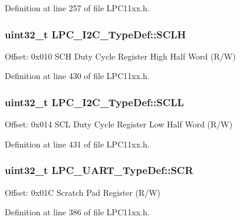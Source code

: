 Definition at line 257 of file L\+P\+C11xx.\+h.

\subsubsection[{\texorpdfstring{S\+C\+LH}{SCLH}}]{ uint32\+\_\+t L\+P\+C\+\_\+\+I2\+C\+\_\+\+Type\+Def\+::\+S\+C\+LH}\hypertarget{group___l_p_c11xx___definitions_ga5e408689670ce2cca437972896bc241d}{}\label{group___l_p_c11xx___definitions_ga5e408689670ce2cca437972896bc241d}
Offset\+: 0x010 S\+CH Duty Cycle Register High Half Word (R/W) 

Definition at line 430 of file L\+P\+C11xx.\+h.

\subsubsection[{\texorpdfstring{S\+C\+LL}{SCLL}}]{ uint32\+\_\+t L\+P\+C\+\_\+\+I2\+C\+\_\+\+Type\+Def\+::\+S\+C\+LL}\hypertarget{group___l_p_c11xx___definitions_gaf1ecc95ca301033c54b4f860858050c7}{}\label{group___l_p_c11xx___definitions_gaf1ecc95ca301033c54b4f860858050c7}
Offset\+: 0x014 S\+CL Duty Cycle Register Low Half Word (R/W) 

Definition at line 431 of file L\+P\+C11xx.\+h.

\subsubsection[{\texorpdfstring{S\+CR}{SCR}}]{ uint32\+\_\+t L\+P\+C\+\_\+\+U\+A\+R\+T\+\_\+\+Type\+Def\+::\+S\+CR}\hypertarget{group___l_p_c11xx___definitions_gae0fdb3089d0cd1e01f42c405fa93fc36}{}\label{group___l_p_c11xx___definitions_gae0fdb3089d0cd1e01f42c405fa93fc36}
Offset\+: 0x01C Scratch Pad Register (R/W) 

Definition at line 386 of file L\+P\+C11xx.\+h.

